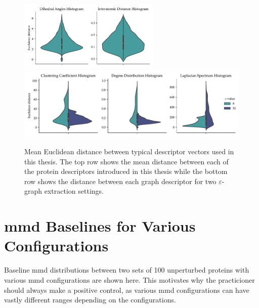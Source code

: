 \begin{figure}
  \centering
  \includegraphics[width=0.6\textwidth]{./figures/results/violin_protein_descriptors.pdf}
  \includegraphics[width=\textwidth]{./figures/results/violin_graph_descriptors.pdf}
  \caption[Mean Euclidean distance between typical descriptor vectors used in
  this thesis]{Mean Euclidean distance between typical descriptor vectors used in
this thesis. The top row shows the mean distance between each of the protein
descriptors introduced in this thesis while the bottom row shows the distance
between each graph descriptor for two $\varepsilon$-graph extraction settings.}
  \label{fig:mean_distance_embedding}
\end{figure}

\clearpage
\section{\gls{mmd} Baselines for Various Configurations}\label{sec:mmd_baselines}
Baseline \gls{mmd} distributions between two sets of 100 unperturbed proteins with
various \gls{mmd} configurations are shown here. This motivates why the
practicioner should always make a positive control, as various \gls{mmd}
configurations can have vastly different ranges depending on the configurations.

